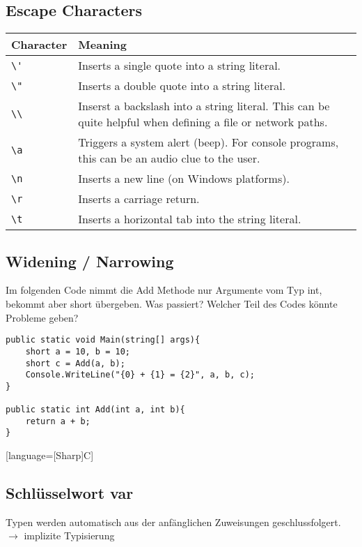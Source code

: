 \subsection{Escape Characters}
\begin{otherlanguage}{english}
\begin{longtable}{L{.2} L{.7}}
Character & Meaning \\\hline
\lstinline$\'$ & Inserts a single quote into a string literal.\\
\lstinline$\"$ & Inserts a double quote into a string literal.\\
\lstinline$\\$ & Inserst a backslash into a string literal. This can be quite helpful when defining a file or network paths.\\
\lstinline$\a$ & Triggers a system alert (beep). For console programs, this can be an audio clue to the user.\\
\lstinline$\n$ & Inserts a new line (on Windows platforms).\\
\lstinline$\r$ & Inserts a carriage return.\\
\lstinline$\t$ & Inserts a horizontal tab into the string literal.
\end{longtable}
\end{otherlanguage}

\subsection{Widening / Narrowing}

Im folgenden Code nimmt die Add Methode nur Argumente vom Typ int, bekommt aber short übergeben. Was passiert? Welcher Teil des Codes könnte Probleme geben?
\begin{lstlisting}[language={[Sharp]C}]
public static void Main(string[] args){
	short a = 10, b = 10;	
	short c = Add(a, b);
	Console.WriteLine("{0} + {1} = {2}", a, b, c);
}

public static int Add(int a, int b){
	return a + b;
}
\end{lstlisting}[language={[Sharp]C}]

\subsection{Schlüsselwort var}
Typen werden automatisch aus der anfänglichen Zuweisungen geschlussfolgert.\\
$\to$ implizite Typisierung

